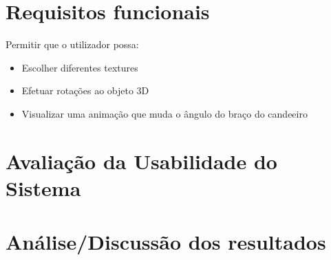 \documentclass[a4paper,12pt]{article}
\begin{document}
\newpage
\section{Requisitos funcionais}
    Permitir que o utilizador possa:
    \begin{itemize}
        \item Escolher diferentes textures
        \item Efetuar rotações ao objeto 3D
        \item Visualizar uma animação que muda o ângulo do braço do candeeiro
    \end{itemize}

\newpage
\section{Avaliação da Usabilidade do Sistema}

\newpage
\section{Análise/Discussão dos resultados}
\end{document}
